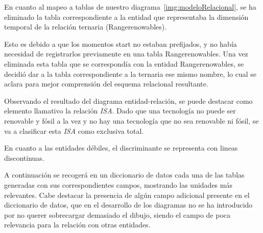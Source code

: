 En cuanto al mapeo a tablas de nuestro diagrama~\ref{img:modeloRelacional}, se ha eliminado la tabla correspondiente a la entidad que representaba la dimensión temporal de la relación ternaria (Rangerenowables).

Esto es debido a que los momentos start no estaban prefijados, y no había necesidad de registrarlos previamente en una tabla Rangerenowables. Una vez eliminada esta tabla que se correspondía con la entidad Rangerenowables, se decidió dar a la tabla correspondiente a la ternaria ese mismo nombre, lo cual se aclara para mejor comprensión del esquema relacional resultante.

Observando el resultado del diagrama entidad-relación, se puede destacar como elemento llamativo la relación \textit{ISA}. Dado que una tecnología no puede ser renovable y fósil a la vez y no hay una tecnología que no sea renovable ni fósil, se va a clasificar esta \textit{ISA} como exclusiva total. 

En cuanto a las entidades débiles, el discriminante se representa con lineas discontinuas. 

A continuación se recogerá en un diccionario de datos cada una de las tablas generadas con sus correspondientes campos, mostrando las unidades más relevantes. Cabe destacar la presencia de algún campo adicional presente en el diccionario de datos, que en el desarrollo de los diagramas no se ha introducido por no querer sobrecargar demasiado el dibujo, siendo el campo de poca relevancia para la relación con otras entidades. 

